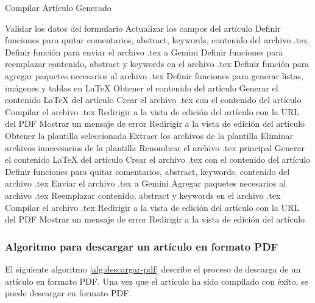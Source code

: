 \begin{algorithm}
    \caption{Compilar Artículo Generado}
    \begin{algorithmic}[1]
        \State Validar los datos del formulario
        \State Actualizar los campos del artículo
        \State Definir funciones para quitar comentarios, abstract, keywords, contenido del archivo .tex
        \State Definir función para enviar el archivo .tex a Gemini
        \State Definir funciones para reemplazar contenido, abstract y keywords en el archivo .tex
        \State Definir función para agregar paquetes necesarios al archivo .tex
        \State Definir funciones para generar listas, imágenes y tablas en LaTeX
        \State Obtener el contenido del artículo
        \State Generar el contenido LaTeX del artículo
            \State Crear el archivo .tex con el contenido del artículo
            \State Compilar el archivo .tex
                \State Redirigir a la vista de edición del artículo con la URL del PDF
            \Else
                \State Mostrar un mensaje de error
                \State Redirigir a la vista de edición del artículo
            \EndIf
        \Else
            \State Obtener la plantilla seleccionada
            \State Extraer los archivos de la plantilla
            \State Eliminar archivos innecesarios de la plantilla
            \State Renombrar el archivo .tex principal
            \State Generar el contenido LaTeX del artículo
            \State Crear el archivo .tex con el contenido del artículo
            \State Definir funciones para quitar comentarios, abstract, keywords, contenido del archivo .tex
            \State Enviar el archivo .tex a Gemini
            \State Agregar paquetes necesarios al archivo .tex
            \State Reemplazar contenido, abstract y keywords en el archivo .tex
            \State Compilar el archivo .tex
                \State Redirigir a la vista de edición del artículo con la URL del PDF
            \Else
                \State Mostrar un mensaje de error
                \State Redirigir a la vista de edición del artículo
            \EndIf
        \EndIf
    \EndProcedure
    \end{algorithmic}
    \label{alg:compilacion-articulo}
\end{algorithm}

\subsubsection{Algoritmo para descargar un artículo en formato PDF}
El siguiente algoritmo \ref{alg:descargar-pdf} describe el proceso de descarga de un artículo en formato PDF. Una vez que el artículo ha sido compilado con éxito, se puede descargar en formato PDF.

